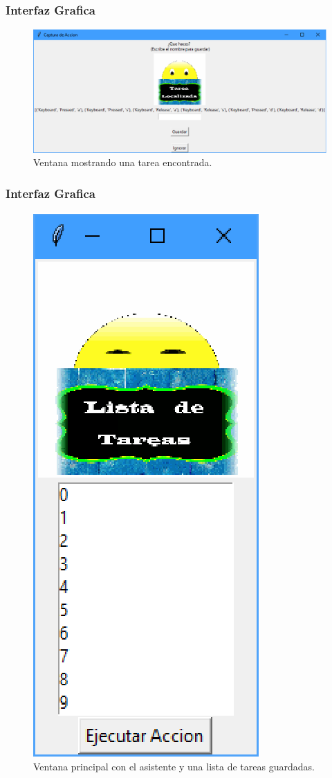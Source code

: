 \begin{frame}
\frametitle{Interfaz Grafica}

\begin{figure}[H]
\centering
\includegraphics[width=1.0\columnwidth]{Imagenes/ventana2.eps}
\caption{Ventana mostrando una tarea encontrada.}
\label{fig:v02}
\end{figure}

\end{frame}


\begin{frame}
\frametitle{Interfaz Grafica}

\begin{figure}[H]
\centering
\includegraphics[width=0.2\columnwidth]{Imagenes/ventana1.eps}
\caption{Ventana principal con el asistente y una lista de tareas
 guardadas.}
\label{fig:v01}
\end{figure} 

\end{frame}


